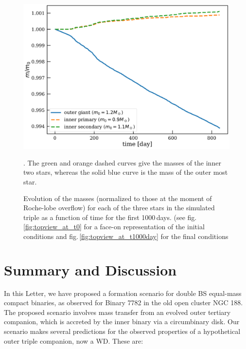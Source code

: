 \documentclass{aastex62}
\begin{document}
\begin{figure}[ht!]
  \includegraphics[width=\columnwidth]{fig_MvsTime_N80k_M012R100RSun1109MSun_a02au.pdf}
\caption{Evolution of the masses (normalized to those at the moment of
  Roche-lobe overflow) for each of the three stars in the simulated triple as a function of
  time for the first 1000\,days. (see fig.\,\ref{fig:topview_at_t0}
  for a face-on representation of the initial conditions and
  fig.\,\ref{fig:topview_at_t1000day} for the final conditions}.  The
green and orange dashed curves give the masses of the inner two stars,
whereas the solid blue curve is the mass of the outer most star.
\label{fig:mass_evolution_for_M1.2M1.1M0.9a02e00i09}
\end{figure}


\section{Summary and Discussion} \label{discussion}

In this Letter, we have proposed a formation scenario for double BS equal-mass compact binaries, as observed for Binary 7782 in the old open cluster NGC 188.  The proposed scenario involves mass transfer from an evolved outer tertiary companion, which is accreted by the inner binary via a circumbinary disk.  Our scenario makes several predictions for the observed properties of a hypothetical outer triple companion, now a WD.  These are:
\end{document}

